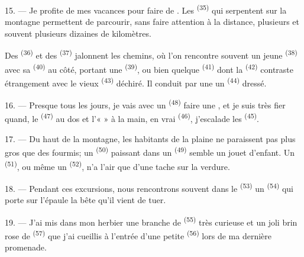 \VUsaut{3.0mm}
\VUsaut{3.0mm}

15. --- Je profite de mes vacances pour faire de .
Les  \textsuperscript{(35)} qui serpentent sur la montagne
permettent de parcourir, sans faire attention à la distance, plusieurs
 et souvent plusieurs dizaines de kilomètres.

Des  \textsuperscript{(36)} et des 
\textsuperscript{(37)} jalonnent les chemins, où l'on rencontre souvent un jeune
 \textsuperscript{(38)} avec sa 
\textsuperscript{(40)} au côté, portant une 
\textsuperscript{(39)}, ou bien quelque  \textsuperscript{(41)}
dont la  \textsuperscript{(42)} contraste étrangement
avec le vieux  \textsuperscript{(43)} déchiré. Il conduit par
une  un  \textsuperscript{(44)} dressé.

\VUsaut{3.0mm}

16. --- Presque tous les jours, je vais avec un 
\textsuperscript{(48)} faire une , et je suis très fier quand,
le  \textsuperscript{(47)} au dos et l'«  » à la
main, en vrai  \textsuperscript{(46)}, j'escalade les
 \textsuperscript{(45)}.

17. --- Du haut de la montagne, les habitants de la plaine ne paraissent pas
plus gros que des fourmis; un 
\textsuperscript{(50)} paissant dans un  \textsuperscript{(49)}
semble un jouet d'enfant. Un  \textsuperscript{(51)}, ou même un
 \textsuperscript{(52)}, n'a l'air que d'une tache sur la
verdure.

18. --- Pendant ces excursions, nous rencontrons souvent dans le
 \textsuperscript{(53)} un 
\textsuperscript{(54)} qui porte sur l'épaule la bête qu'il vient de tuer.

19. --- J'ai mis dans mon herbier une branche de 
\textsuperscript{(55)} très curieuse et un joli brin rose de 
\textsuperscript{(57)} que j'ai cueillis à l'entrée d'une petite 
\textsuperscript{(56)} lors de ma dernière promenade.

